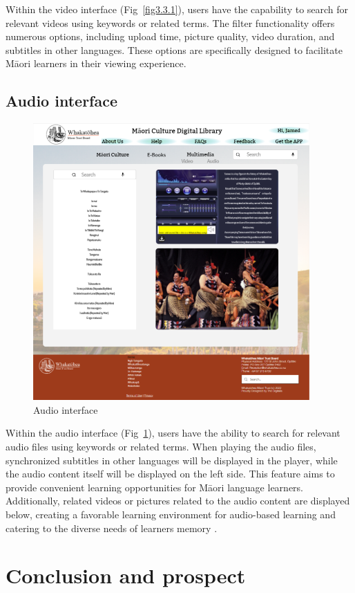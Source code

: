 Within the video interface (Fig~\ref{fig3.3.1}), users have the capability to search for relevant videos using keywords or related terms. The filter functionality offers numerous options, including upload time, picture quality, video duration, and subtitles in other languages. These options are specifically designed to facilitate Māori learners in their viewing experience.

\subsection{Audio interface}

\begin{figure}[htbp]
  \centerline{\includegraphics[width=300pt]{images/3-3-2.png}}
  \caption{Audio interface}
  \label{fig3.3.2}
\end{figure}

Within the audio interface (Fig~\ref{fig3.3.2}), users have the ability to search for relevant audio files using keywords or related terms. When playing the audio files, synchronized subtitles in other languages will be displayed in the player, while the audio content itself will be displayed on the left side. This feature aims to provide convenient learning opportunities for Māori language learners. Additionally, related videos or pictures related to the audio content are displayed below, creating a favorable learning environment for audio-based learning and catering to the diverse needs of learners memory \autocite{MaoriHis64:online}.

\section{Conclusion and prospect}

